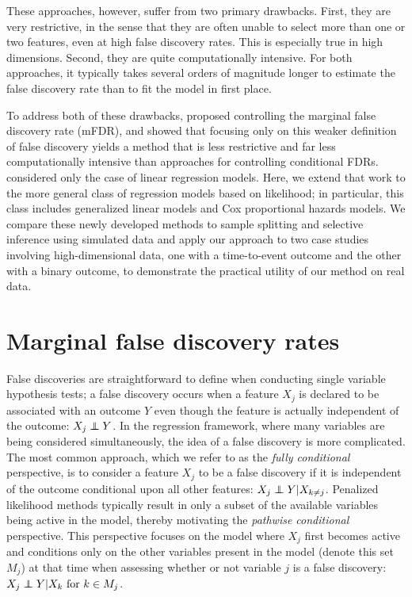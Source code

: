 These approaches, however, suffer from two primary drawbacks.  First, they are very restrictive, in the sense that they are often unable to select more than one or two features, even at high false discovery rates.  This is especially true in high dimensions.  Second, they are quite computationally intensive.  For both approaches, it typically takes several orders of magnitude longer to estimate the false discovery rate than to fit the model in first place.

To address both of these drawbacks, \citet{BrehenyMFDR} proposed controlling the marginal false discovery rate (mFDR), and showed that focusing only on this weaker definition of false discovery yields a method that is less restrictive and far less computationally intensive than approaches for controlling conditional FDRs.  \citet{BrehenyMFDR} considered only the case of linear regression models.  Here, we extend that work to the more general class of regression models based on likelihood; in particular, this class includes generalized linear models and Cox proportional hazards models.  We compare these newly developed methods to sample splitting and selective inference using simulated data and apply our approach to two case studies involving high-dimensional data, one with a time-to-event outcome and the other with a binary outcome, to demonstrate the practical utility of our method on real data.

\section{Marginal false discovery rates}
\label{Sec:mfdr}

False discoveries are straightforward to define when conducting single variable hypothesis tests; a false discovery occurs when a feature $X_j$ is declared to be associated with an outcome $Y$ even though the feature is actually independent of the outcome: $X_j \independent Y$. In the regression framework, where many variables are being considered simultaneously, the idea of a false discovery is more complicated. The most common approach, which we refer to as the \textit{fully conditional} perspective, is to consider a feature $X_j$ to be a false discovery if it is independent of the outcome conditional upon all other features: $X_j \independent Y | X_{k \neq j}$. Penalized likelihood methods typically result in only a subset of the available variables being active in the model, thereby motivating the \textit{pathwise conditional} perspective.  This perspective focuses on the model where $X_j$ first becomes active and conditions only on the other variables present in the model (denote this set $M_j$) at that time when assessing whether or not variable $j$ is a false discovery: $X_j \independent Y | X_k \text{ for } k \in M_j$.


